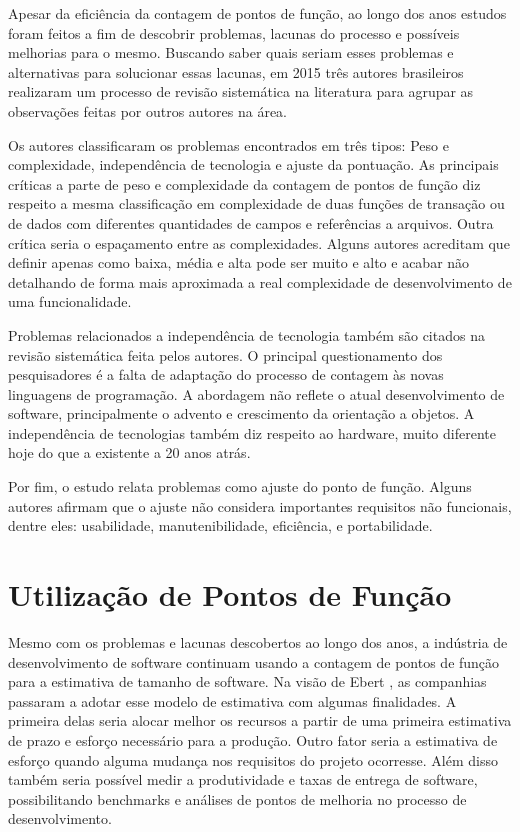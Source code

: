Apesar da eficiência da contagem de pontos de função, ao longo dos anos estudos foram feitos a fim de descobrir problemas, lacunas do processo e possíveis melhorias para o mesmo. Buscando saber quais seriam esses problemas e alternativas para solucionar essas lacunas, em 2015 três autores brasileiros realizaram um processo de revisão sistemática na literatura para agrupar as observações feitas por outros autores na área.

Os autores classificaram os problemas encontrados em três tipos: Peso e complexidade, independência de tecnologia e ajuste da pontuação. As principais críticas a parte de peso e complexidade da contagem de pontos de função diz respeito a mesma classificação em complexidade de duas funções de transação ou de dados com diferentes quantidades de campos e referências a arquivos. Outra crítica seria o espaçamento entre as complexidades. Alguns autores acreditam que definir apenas como baixa, média e alta pode ser muito e alto e acabar não detalhando de forma mais aproximada a real complexidade de desenvolvimento de uma funcionalidade. \cite{Marcos:2015}

Problemas relacionados a independência de tecnologia também são citados na revisão sistemática feita pelos autores. O principal questionamento dos pesquisadores é a falta de adaptação do processo de contagem às novas linguagens de programação. A abordagem não reflete o atual desenvolvimento de software, principalmente o advento e crescimento da orientação a objetos. A independência de tecnologias também diz respeito ao hardware, muito diferente hoje do que a existente a 20 anos atrás. \cite{Marcos:2015}

Por fim, o estudo relata problemas como ajuste do ponto de função. Alguns autores afirmam que o ajuste não considera  importantes requisitos não funcionais, dentre eles: usabilidade, manutenibilidade, eficiência, e portabilidade. \cite{Marcos:2015}

\section{Utilização de Pontos de Função}

Mesmo com os problemas e lacunas descobertos ao longo dos anos, a indústria de desenvolvimento de software continuam usando a contagem de pontos de função para a estimativa de tamanho de software. Na visão de Ebert \cite{Ebert:2014}, as companhias passaram a adotar esse modelo de estimativa com algumas finalidades. A primeira delas seria alocar melhor os recursos a partir de uma primeira estimativa de prazo e esforço necessário para a produção. Outro fator seria a estimativa de esforço quando alguma mudança nos requisitos do projeto ocorresse. Além disso também seria possível medir a produtividade e taxas de entrega de software, possibilitando benchmarks  e análises de pontos de melhoria no processo de desenvolvimento.

